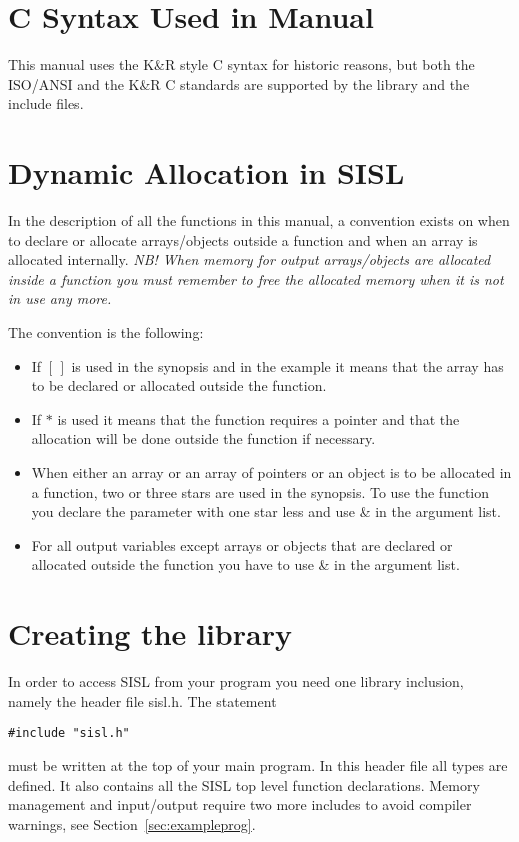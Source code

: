 
\section{\label{syntax}C Syntax Used in Manual}
This manual uses the K\&R style C syntax for historic reasons, but both
the ISO/ANSI and the K\&R C standards are supported by the library and
the include files.

\section{\label{dynamic}Dynamic Allocation in SISL}
In the description of all the functions in this manual, a
convention exists on when to declare or allocate arrays/objects outside a
function and when an array is allocated internally.
{\em NB! When memory for output arrays/objects are allocated inside a function you
must remember to free the allocated memory when it is not in use any
more.}

The convention is the following:
\begin{itemize}
\item If $[\,]$ is used in the synopsis and in the example it means
that the array has to be declared or allocated outside the function.
\item If $*$ is used it means that the function requires a
pointer and that the allocation will be done outside the function if necessary.
\item When either an array or an array of pointers or an object is to be
allocated in a function, two or three stars are used in the
synopsis.
To use the function you declare the parameter with one star less and use  \&
in the argument list.
\item For all output variables except arrays or objects
that are declared or allocated  outside the function you have to use \&
in the argument list.
\end{itemize}


\vfill
\newpage
\section{Creating the library}

In order to access SISL from your program you need one library inclusion, namely
the header file sisl.h. The statement
\begin{verbatim}
#include "sisl.h"
\end{verbatim}
must be written at the top of your main program.
In this header file all types
are defined.
It also contains all the
SISL top level function declarations.
Memory management and input/output require two more includes to avoid compiler warnings,
see Section~\ref{sec:exampleprog}.

